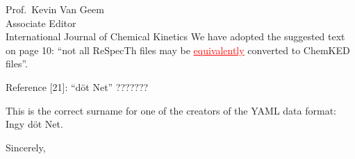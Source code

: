 \documentclass[11pt]{OSUletter}
\newcommand{\addtwo}[1]{{\sloppy\textcolor{red}{\uline{#1}}}}  %
\begin{document}
\begin{letter}{
               Prof.~Kevin Van Geem\\
               Associate Editor\\
               International Journal of Chemical Kinetics
               }
We have adopted the suggested text on page 10:
``not all ReSpecTh files may be \addtwo{equivalently} converted to ChemKED files''.

\begin{quoting}
    Reference [21]:
    ``döt Net''   ???????
\end{quoting}

This is the correct surname for one of the creators of the YAML data format: Ingy döt Net.


\closing{Sincerely,}




\end{letter}
\end{document}
